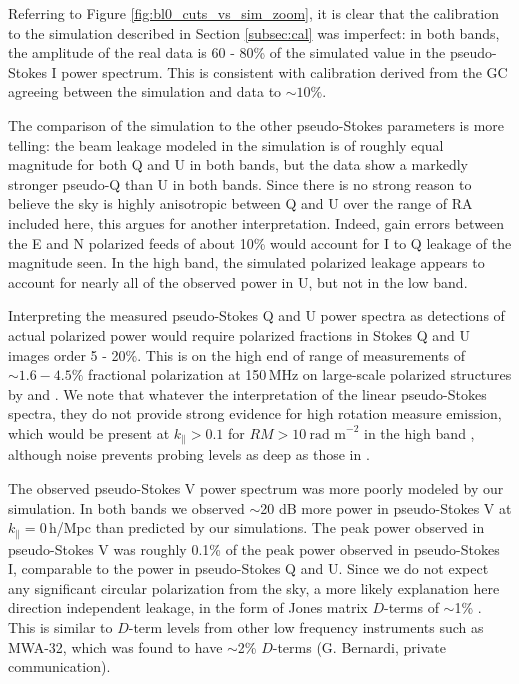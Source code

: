 \documentclass[twocolumn, trackchanges]{aastex61}
\begin{document}
{Referring to Figure \ref{fig:bl0_cuts_vs_sim_zoom}, it is clear that the calibration to the simulation described in Section \ref{subsec:cal} was imperfect: in both bands, the amplitude of the real data is 60 - 80\% of the simulated value in the pseudo-Stokes I power spectrum.  This is consistent with calibration derived from the GC agreeing between the simulation and data to $\sim10\%$.

The comparison of the simulation to the other pseudo-Stokes parameters is more telling: the beam leakage modeled in the simulation is of roughly equal magnitude for both Q and U in both bands, but the data show a markedly stronger pseudo-Q than U in both bands.  Since there is no strong reason to believe the sky is highly anisotropic between Q and U over the range of RA included here, this argues for another interpretation.  Indeed, gain errors between the E and N polarized feeds of about 10\% would account for I to Q leakage of the magnitude seen.  In the high band, the simulated polarized leakage appears to account for nearly all of the observed power in U, but not in the low band.   

Interpreting the measured pseudo-Stokes Q and U power spectra as detections of actual polarized power would require polarized fractions in Stokes Q and U images order 5 - 20\%.  This is on the high end of range of measurements of $\sim 1.6 - 4.5\%$ fractional polarization at 150\,MHz on large-scale polarized structures by \cite{Jelic.15} and \cite{Lenc.16}.  We note that whatever the interpretation of the linear pseudo-Stokes spectra, they do not provide strong evidence for high rotation measure emission, which would be present at $k_\parallel > 0.1$ for $RM > 10~\text{rad m}^{-2}$ in the high band \cite{Moore17}, although noise prevents probing levels as deep as those in \cite{Asad18}.

The observed pseudo-Stokes V power spectrum was more poorly modeled by our simulation. In both bands we observed $\sim$20 dB more power in pseudo-Stokes V at $k_{\parallel}=0$\,h/Mpc than predicted by our simulations. The peak power observed in pseudo-Stokes V was roughly 0.1\% of the peak power observed in pseudo-Stokes I, comparable to the power in pseudo-Stokes Q and U.   Since we do not expect any significant circular polarization from the sky, a more likely explanation here direction independent leakage, in the form of Jones matrix 
$D$-terms of $\sim$1\% \citep{TMS}. This is similar to $D$-term levels from other low frequency instruments such as MWA-32, which was found to have $\sim$2\% $D$-terms (G. Bernardi, private communication).

}
\end{document}

